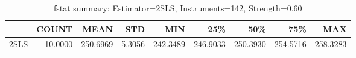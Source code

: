 \begin{table}[ht]
\centering
\caption{fstat summary: Estimator=2SLS, Instruments=142, Strength=0.60}
\begin{tabular}{lrrrrrrrr}
\toprule
 & COUNT & MEAN & STD & MIN & 25\% & 50\% & 75\% & MAX \\
\midrule
2SLS & 10.0000 & 250.6969 & 5.3056 & 242.3489 & 246.9033 & 250.3930 & 254.5716 & 258.3283 \\
\bottomrule
\end{tabular}
\end{table}
